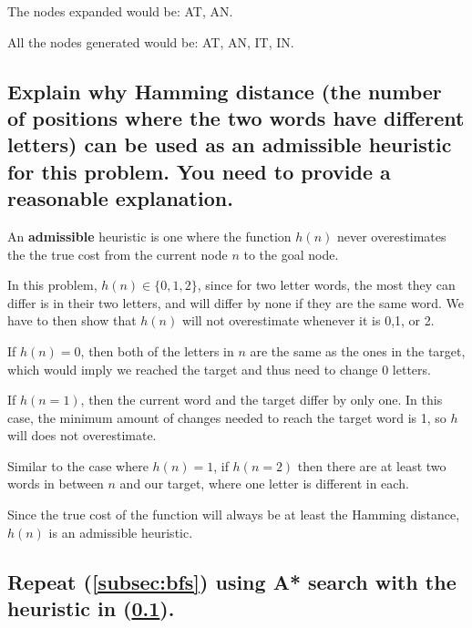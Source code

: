 \documentclass{article}
\begin{document}
		The nodes expanded would be: AT, AN. 

		All the nodes generated would be: AT, AN, IT, IN.
	\subsection{Explain why Hamming distance (the number of positions where the two words have 
		different letters) can be used as an admissible heuristic for this problem. You need to 
		provide a reasonable explanation.}
		\label{subsec:hamming}
		An \textbf{admissible} heuristic is one where the function $h(n)$ never overestimates the
		the true cost from the current node $n$ to the goal node. 
		
		In this problem, $h(n) \in \{0,1,2\}$, since for two letter words, the most they can differ is in their
		two letters, and will differ by none if they are the same word. We have to then show that $h(n)$ will 
		not overestimate whenever it is 0,1, or 2. 

		If $h(n) = 0$, then both of the letters in $n$ are the same as the ones in the target, which would 
		imply we reached the target and thus need to change 0 letters.
	
		If $h(n = 1)$, then the current word and the target differ by only one. In this case, the minimum amount
		of changes needed to reach the target word is 1, so $h$ will does not overestimate.

		Similar to the case where $h(n) = 1$, if $h(n = 2)$ then there are at least two words in between
		$n$ and our target, where one letter is different in each. 

		Since the true cost of the function will always be at least the Hamming distance, $h(n)$ is an 
		admissible heuristic.
	\subsection{Repeat (\ref{subsec:bfs}) using A* search with the heuristic in (\ref{subsec:hamming}).}
\end{document}
